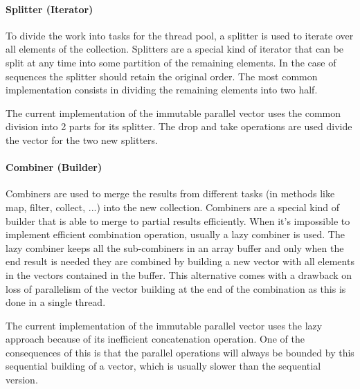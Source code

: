 
\paragraph{Splitter (Iterator)}
To divide the work into tasks for the thread pool, a splitter is used to iterate over all elements of the collection. Splitters are a special kind of iterator that can be split at any time into some partition of the remaining elements. In the case of sequences the splitter should retain the original order. The most common implementation consists in dividing the remaining elements into two half. 

The current implementation of the immutable parallel  vector uses the common division into 2 parts for its splitter. The drop and take operations are used divide the vector for the two new splitters.


\paragraph{Combiner (Builder)}
Combiners are used to merge the results from different tasks (in methods like map, filter, collect, ...) into the new collection. Combiners are a special kind of builder that is able to merge to partial results efficiently. When it's impossible to implement efficient combination operation, usually a lazy combiner is used. The lazy combiner keeps all the sub-combiners in an array buffer and only when the end result is needed they are combined by building a new vector with all elements in the vectors contained in the buffer. This alternative comes with a drawback on loss of parallelism of the vector building at the end of the combination as this is done in a single thread. 

The current implementation of the immutable parallel vector uses the lazy approach because of its inefficient concatenation operation. One of the consequences of this is that the parallel operations will always be bounded by this sequential building of a vector, which is usually slower than the sequential version.
 

\clearpage
